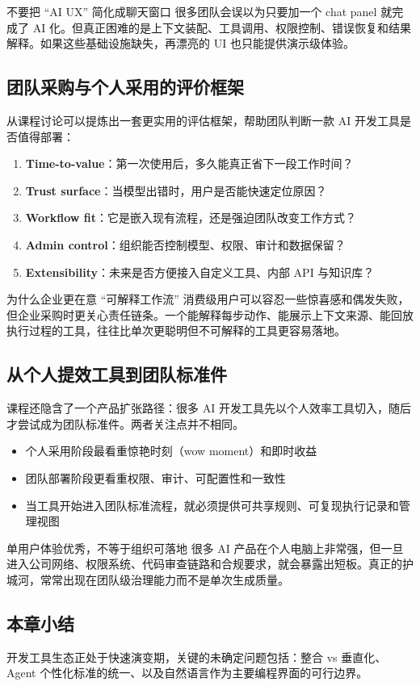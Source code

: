 \begin{warningbox}{不要把 ``AI UX'' 简化成聊天窗口}
很多团队会误以为只要加一个 chat panel 就完成了 AI 化。但真正困难的是上下文装配、工具调用、权限控制、错误恢复和结果解释。如果这些基础设施缺失，再漂亮的 UI 也只能提供演示级体验。
\end{warningbox}

\subsection{团队采购与个人采用的评价框架}

从课程讨论可以提炼出一套更实用的评估框架，帮助团队判断一款 AI 开发工具是否值得部署：

\begin{enumerate}
    \item \textbf{Time-to-value}：第一次使用后，多久能真正省下一段工作时间？
    \item \textbf{Trust surface}：当模型出错时，用户是否能快速定位原因？
    \item \textbf{Workflow fit}：它是嵌入现有流程，还是强迫团队改变工作方式？
    \item \textbf{Admin control}：组织能否控制模型、权限、审计和数据保留？
    \item \textbf{Extensibility}：未来是否方便接入自定义工具、内部 API 与知识库？
\end{enumerate}

\begin{knowledgebox}{为什么企业更在意 ``可解释工作流''}
消费级用户可以容忍一些惊喜感和偶发失败，但企业采购时更关心责任链条。一个能解释每步动作、能展示上下文来源、能回放执行过程的工具，往往比单次更聪明但不可解释的工具更容易落地。
\end{knowledgebox}

\subsection{从个人提效工具到团队标准件}

课程还隐含了一个产品扩张路径：很多 AI 开发工具先以个人效率工具切入，随后才尝试成为团队标准件。两者关注点并不相同。

\begin{itemize}
    \item 个人采用阶段最看重惊艳时刻（wow moment）和即时收益
    \item 团队部署阶段更看重权限、审计、可配置性和一致性
    \item 当工具开始进入团队标准流程，就必须提供可共享规则、可复现执行记录和管理视图
\end{itemize}

\begin{warningbox}{单用户体验优秀，不等于组织可落地}
很多 AI 产品在个人电脑上非常强，但一旦进入公司网络、权限系统、代码审查链路和合规要求，就会暴露出短板。真正的护城河，常常出现在团队级治理能力而不是单次生成质量。
\end{warningbox}

\subsection{本章小结}

开发工具生态正处于快速演变期，关键的未确定问题包括：整合 vs 垂直化、Agent 个性化标准的统一、以及自然语言作为主要编程界面的可行边界。

